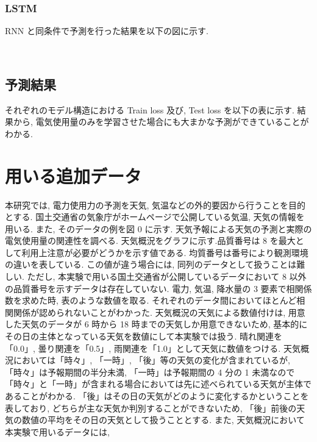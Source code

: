 \subsubsection{LSTM}
RNN と同条件で予測を行った結果を以下の図に示す.

　


\subsection{予測結果}
それぞれのモデル構造における Train loss 及び, Test loss を以下の表に示す.
結果から, 電気使用量のみを学習させた場合にも大まかな予測ができていることがわかる.


\section{用いる追加データ}
本研究では, 電力使用力の予測を天気, 気温などの外的要因から行うことを目的とする.
国土交通省の気象庁がホームページで公開している気温, 天気の情報を用いる.
また, そのデータの例を図 0 に示す. 天気予報による天気の予測と実際の電気使用量の関連性を調べる. 天気概況をグラフに示す.品質番号は 8 を最大として利用上注意が必要がどうかを示す値である. 均質番号は番号により観測環境の違いを表している. この値が違う場合には, 同列のデータとして扱うことは難しい. ただし, 本実験で用いる国土交通省が公開しているデータにおいて 8 以外の品質番号を示すデータは存在していない.
電力, 気温, 降水量の 3 要素で相関係数を求めた時, 表のような数値を取る.
それぞれのデータ間においてほとんど相関関係が認められないことがわかった.
天気概況の天気による数値付けは, 用意した天気のデータが 6 時から 18 時までの天気しか用意できないため, 基本的にその日の主体となっている天気を数値にして本実験では扱う.
晴れ関連を「0.0」, 曇り関連を「0.5」, 雨関連を「1.0」として天気に数値をつける.
天気概況においては「時々」, 「一時」, 「後」等の天気の変化が含まれているが, 「時々」は予報期間の半分未満, 「一時」は予報期間の 4 分の 1 未満なので「時々」と「一時」が含まれる場合においては先に述べられている天気が主体であることがわかる.
「後」はその日の天気がどのように変化するかということを表しており, どちらが主な天気か判別することができないため, 「後」前後の天気の数値の平均をその日の天気として扱うこととする.
また, 天気概況において本実験で用いるデータには, 

